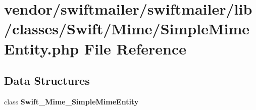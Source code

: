 \section{vendor/swiftmailer/swiftmailer/lib/classes/\+Swift/\+Mime/\+Simple\+Mime\+Entity.php File Reference}
\label{_simple_mime_entity_8php}
\subsection*{Data Structures}
\begin{DoxyCompactItemize}
\item 
class {\bf Swift\+\_\+\+Mime\+\_\+\+Simple\+Mime\+Entity}
\end{DoxyCompactItemize}
